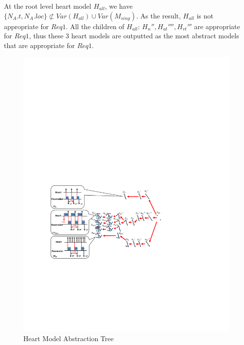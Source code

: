 At the root level heart model $H_{all}$, we have $\{N_A.t,N_A.loc\} \not \subset Var(H_{all})\cup Var(M_{sing})$. As the result, $H_{all}$ is not appropriate for $Req1$. All the children of $H_{all}$: $H_n'',H_{at}'''',H_{vt}'''$ are appropriate for $Req1$,
thus these 3 heart models are outputted as the most abstract models that are appropriate for $Req1$.
\begin{figure}[!t]
	\centering
	\includegraphics[width=1.05\textwidth]{figs/abs_rev.pdf}
	\caption{\small Heart Model Abstraction Tree}
	\vspace{-10pt}
	\label{fig:CE}
\end{figure}
